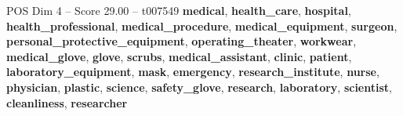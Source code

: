 \begin{textsample}{POS Dim 4 – Score 29.00 – t007549}  \label{ex:f4_pos_016}
\textbf{medical}, \textbf{health\_care}, \textbf{hospital}, \textbf{health\_professional}, \textbf{medical\_procedure}, \textbf{medical\_equipment}, \textbf{surgeon}, \textbf{personal\_protective\_equipment}, \textbf{operating\_theater}, \textbf{workwear}, \textbf{medical\_glove}, \textbf{glove}, \textbf{scrubs}, \textbf{medical\_assistant}, \textbf{clinic}, \textbf{patient}, \textbf{laboratory\_equipment}, \textbf{mask}, \textbf{emergency}, \textbf{research\_institute}, \textbf{nurse}, \textbf{physician}, \textbf{plastic}, \textbf{science}, \textbf{safety\_glove}, \textbf{research}, \textbf{laboratory}, \textbf{scientist}, \textbf{cleanliness}, \textbf{researcher}

\end{textsample}
